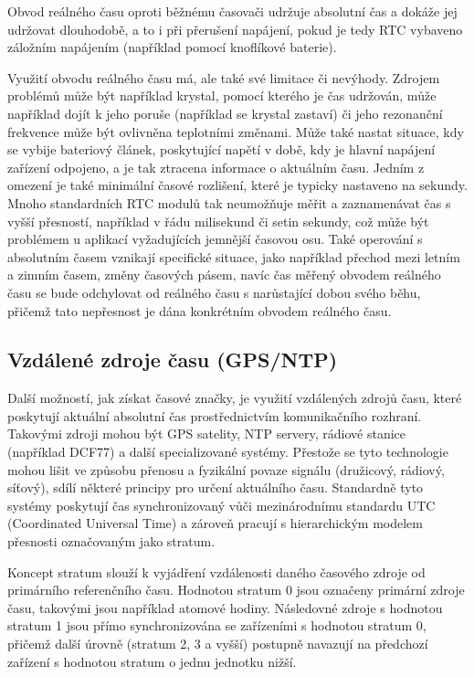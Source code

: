 Obvod reálného času oproti běžnému časovači udržuje absolutní čas a dokáže jej udržovat dlouhodobě, a to i při přerušení napájení, pokud je tedy RTC vybaveno záložním napájením (například pomocí knoflíkové baterie).

Využití obvodu reálného času má, ale také své limitace či nevýhody. Zdrojem problémů může být například krystal, pomocí kterého je čas udržován, může například dojít k jeho poruše (například se krystal zastaví) či jeho rezonanční frekvence může být ovlivněna teplotními změnami. Může také nastat situace, kdy se vybije bateriový článek, poskytující napětí v době, kdy je hlavní napájení zařízení odpojeno, a je tak ztracena informace o aktuálním času. Jedním z omezení je také minimální časové rozlišení, které je typicky nastaveno na sekundy. Mnoho standardních RTC modulů tak neumožňuje měřit a zaznamenávat čas s vyšší přesností, například v řádu milisekund či setin sekundy, což může být problémem u aplikací vyžadujících jemnější časovou osu. Také operování s absolutním časem vznikají specifické situace, jako například přechod mezi letním a zimním časem, změny časových pásem, navíc čas měřený obvodem reálného času se bude odchylovat od reálného času s narůstající dobou svého běhu, přičemž tato nepřesnost je dána konkrétním obvodem reálného času. \cite{jameco_choosing_right_real_time_clock_chip_or_module, embed_journal_interfacing_rtc_with_microcontroler, medium_rtc}

\subsection{Vzdálené zdroje času (GPS/NTP)}
Další možností, jak získat časové značky, je využití vzdálených zdrojů času, které poskytují aktuální absolutní čas prostřednictvím komunikačního rozhraní. Takovými zdroji mohou být GPS satelity, NTP servery, rádiové stanice (například DCF77) a další specializované systémy. Přestože se tyto technologie mohou lišit ve způsobu přenosu a fyzikální povaze signálu (družicový, rádiový, síťový), sdílí některé principy pro určení aktuálního času. Standardně tyto systémy poskytují čas synchronizovaný vůči mezinárodnímu standardu UTC (Coordinated Universal Time) a zároveň pracují s hierarchickým modelem přesnosti označovaným jako stratum.

Koncept stratum slouží k vyjádření vzdálenosti daného časového zdroje od primárního referenčního času. Hodnotou stratum 0 jsou označeny primární zdroje času, takovými jsou například atomové hodiny. Následovné zdroje s hodnotou stratum 1 jsou přímo synchronizována se zařízeními s hodnotou stratum 0, přičemž další úrovně (stratum 2, 3 a vyšší) postupně navazují na předchozí zařízení s hodnotou stratum o jednu jednotku nižší.

